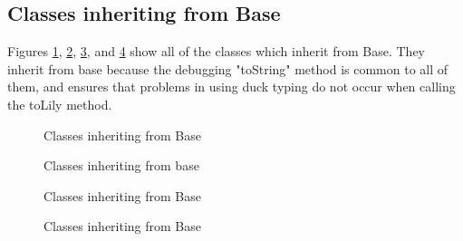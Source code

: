 \begin{appendices}
\begin{landscape}
\subsection{Classes inheriting from Base}
Figures \ref{fig:base}, \ref{fig:base1}, \ref{fig:base2}, and \ref{fig:base3} show all of the classes which inherit from Base. They inherit from base because the debugging "toString" method is common to all of them, and ensures that problems in using duck typing do not occur when calling the toLily method. 
\begin{figure}[H]
\caption{Classes inheriting from Base}
\label{fig:base}
\end{figure}
\begin{figure}[H]
\caption{Classes inheriting from base}
\label{fig:base1}
\end{figure}
\begin{figure}[H]
  
\caption{Classes inheriting from Base}
\label{fig:base2}
\end{figure}
\begin{figure}[H]
  
\caption{Classes inheriting from Base}
\label{fig:base3}
\end{figure}

\end{landscape}
\end{appendices}
